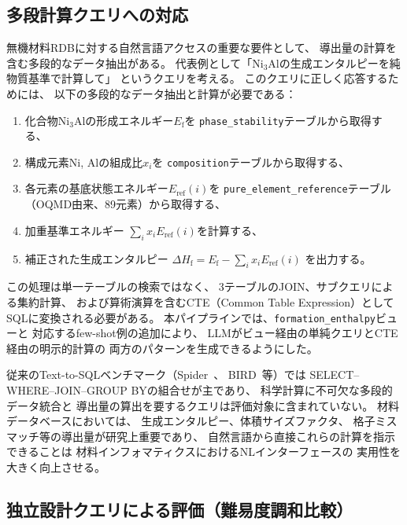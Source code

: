 \documentclass[5p,twocolumn]{elsarticle}
\begin{document}
\subsection{多段計算クエリへの対応}
\label{sec:multistep_query}

無機材料RDBに対する自然言語アクセスの重要な要件として、
導出量の計算を含む多段的なデータ抽出がある。
代表例として「Ni$_3$Alの生成エンタルピーを純物質基準で計算して」
というクエリを考える。
このクエリに正しく応答するためには、
以下の多段的なデータ抽出と計算が必要である：
\begin{enumerate}
  \item 化合物Ni$_3$Alの形成エネルギー$E_\mathrm{f}$を
    \texttt{phase\_stability}テーブルから取得する、
  \item 構成元素Ni, Alの組成比$x_i$を
    \texttt{composition}テーブルから取得する、
  \item 各元素の基底状態エネルギー$E_\mathrm{ref}(i)$を
    \texttt{pure\_element\_reference}テーブル
    （OQMD由来、89元素）から取得する、
  \item 加重基準エネルギー
    $\sum_i x_i E_\mathrm{ref}(i)$を計算する、
  \item 補正された生成エンタルピー
    $\Delta H_\mathrm{f} = E_\mathrm{f} - \sum_i x_i E_\mathrm{ref}(i)$
    を出力する。
\end{enumerate}

この処理は単一テーブルの検索ではなく、
3テーブルのJOIN、サブクエリによる集約計算、
および算術演算を含むCTE（Common Table Expression）として
SQLに変換される必要がある。
本パイプラインでは、\texttt{formation\_enthalpy}ビューと
対応するfew-shot例の追加により、
LLMがビュー経由の単純クエリとCTE経由の明示的計算の
両方のパターンを生成できるようにした。

従来のText-to-SQLベンチマーク（Spider~\cite{yu2018spider}、
BIRD~\cite{li2024bird}等）では
SELECT--WHERE--JOIN--GROUP BYの組合せが主であり、
科学計算に不可欠な多段的データ統合と
導出量の算出を要するクエリは評価対象に含まれていない。
材料データベースにおいては、
生成エンタルピー、体積サイズファクタ、
格子ミスマッチ等の導出量が研究上重要であり、
自然言語から直接これらの計算を指示できることは
材料インフォマティクスにおけるNLインターフェースの
実用性を大きく向上させる。

\subsection{独立設計クエリによる評価（難易度調和比較）}
\label{sec:independent_eval}
\end{document}
